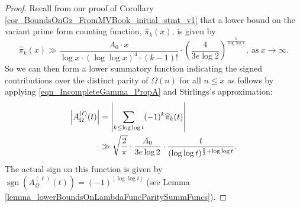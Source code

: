 \documentclass[11pt,reqno,a4letter]{article}
\numberwithin{figure}{section}
\numberwithin{table}{section}
\newcommand{\floor}[1]{\left\lfloor #1 \right\rfloor}
\theoremstyle{plain}
\numberwithin{theorem}{section}
\theoremstyle{definition}
\newcommand{\SuccSim}[0]{\overset{_{\scriptsize{\blacktriangle}}}{\succsim}}
\renewcommand{\SuccSim}[0]{\ensuremath{\gg}}
\begin{document}
\begin{proof} 
Recall from our proof of Corollary \ref{cor_BoundsOnGz_FromMVBook_initial_stmt_v1} that 
a lower bound on the variant prime form counting function, $\widehat{\pi}_k(x)$, is given by 
\[
\widehat{\pi}_k(x) \SuccSim \frac{A_0 \cdot x}{\log x \cdot (\log\log x)^4 \cdot (k-1)!} \cdot 
     \left(\frac{4}{3e\log 2}\right)^{\frac{k}{\log\log x}}, \mathrm{\ as\ } x \rightarrow \infty. 
\]
So we can then form a lower summatory function indicating the signed contributions over the distinct 
parity of $\Omega(n)$ for all $n \leq x$ as follows by applying 
\eqref{eqn_IncompleteGamma_PropA} and Stirlings's approximation: 
\begin{align} 
\label{proof_thm_GInvFunc_v0} 
\left\lvert A_{\Omega}^{(\ell)}(t) \right\rvert & = 
     \left\lvert \sum_{k \leq \log\log t} (-1)^k \widehat{\pi}_k(t) \right\rvert \\ 
\notag
     & \SuccSim  
     \sqrt{\frac{2}{\pi}} \cdot \frac{A_0}{3e \log 2} \cdot 
     \frac{t}{(\log\log t)^{\frac{5}{2} + \log\log t}}. 
\end{align} 
The actual sign on this function is given by 
$\operatorname{sgn}(A_{\Omega}^{(\ell)}(t)) = (-1)^{\floor{\log\log t}}$ 
(see Lemma \ref{lemma_lowerBoundsOnLambdaFuncParitySummFuncs}). 


\end{proof}
\end{document}
